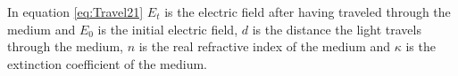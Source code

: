 In equation \ref{eq:Travel21} $E_{t}$ is the electric field after having traveled through the medium and $E_{0}$ is the initial electric field, $d$ is the distance the light travels through the medium, $n$ is the real refractive index of the medium and $\kappa$ is the extinction coefficient of the medium.


\endinput
